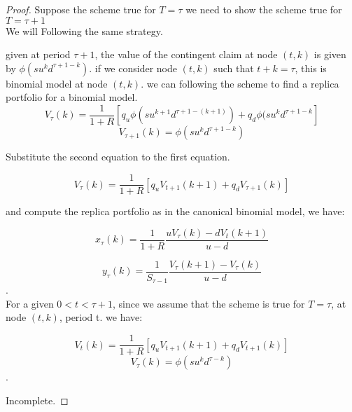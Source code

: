 \documentclass[]{book}
\theoremstyle{definition}
\begin{document}
\begin{enumerate}
\begin{proof}
Suppose the scheme true for $T=\tau$
we need to show the scheme true for $T=\tau+1$\\

We will Following the same strategy.

given at period $\tau +1$, the value of the contingent claim at node $(t,k)$  is given by $\phi(su^kd^{\tau+1 - k})$. 
if we consider node $(t,k)$ such that $t+k = \tau$, this is binomial model at node $(t,k)$. we can following the scheme to find a replica portfolio for a binomial model.
$$V_{\tau}(k) = \frac{1}{1+R}\left[q_u\phi(su^{k+1} d^{\tau+1-(k+1)})+q_d\phi(su^{k}d^{\tau +1 -k}\right]$$
$$V_{\tau+1}(k) = \phi(su^kd^{\tau+1-k})$$

Substitute the second equation to the first equation.

$$V_{\tau}(k) = \frac{1}{1+R}\left[q_uV_{t+1}(k+1)+q_dV_{\tau +1}(k)\right]$$

and compute the replica portfolio as in the canonical binomial model, we have:

$$x_{\tau}(k) = \frac{1}{1+R} \frac{uV_{\tau}(k) -dV_t(k+1)}{u-d}$$

$$y_{\tau}(k) = \frac{1}{S_{\tau-1}}\frac{V_{\tau}(k+1)-V_{\tau}(k)}{u-d}$$.\\

For a given $0<t<\tau +1$, 
since we assume that the scheme is true for $T=\tau$, at node $(t,k)$, period t. we have:

$$V_{t}(k) = \frac{1}{1+R}\left[q_uV_{t+1}(k+1)+q_dV_{t +1}(k)\right]$$
$$V_{\tau}(k) = \phi(su^kd^{\tau-k})$$.

Incomplete.







\end{proof}









































\end{enumerate}
\end{document}
